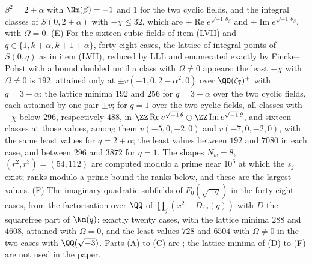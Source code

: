 \begin{enumerate}[label=\textup{(\Roman*)},leftmargin=*]
  $\beta^{2}=2+\alpha$ with $\Nm(\beta)=-1$ and $1$ for the two cyclic
  fields, and the integral classes of $S(0,2+\alpha)$ with $-\chi\le32$,
  which are $\pm\operatorname{Re}e^{\sqrt{-1}\,\theta_{\beta}}$ and
  $\pm\operatorname{Im}e^{\sqrt{-1}\,\theta_{\beta}}$, with $\Omega=0$. (E)
  For the sixteen cubic fields of item (LVII) and $q\in\{1,k+\alpha,
  k+1+\alpha\}$, forty-eight cases, the lattice of integral points of
  $S(0,q)$ as in item (LVII), reduced by LLL and enumerated exactly by
  Fincke--Pohst with a bound doubled until a class with $\Omega\ne0$
  appears: the least $-\chi$ with $\Omega\ne0$ is $192$, attained only at
  $\pm v(-1,0,2-\alpha^{2},0)$ over $\QQ(\zeta_{7})^{+}$ with $q=3+\alpha$;
  the lattice minima $192$ and $256$ for $q=3+\alpha$ over the two cyclic
  fields, each attained by one pair $\pm v$; for $q=1$ over the two cyclic
  fields, all classes with $-\chi$ below $296$, respectively $488$, in
  $\ZZ\operatorname{Re}e^{\sqrt{-1}\,\theta}\oplus\ZZ\operatorname{Im}
  e^{\sqrt{-1}\,\theta}$, and sixteen classes at those values, among them
  $v(-5,0,-2,0)$ and $v(-7,0,-2,0)$, with the same least values for
  $q=2+\alpha$; the least values between $192$ and $7080$ in each case, and
  between $296$ and $3872$ for $q=1$. The shapes $N_{w}=8$,
  $(r^{2},r^{3})=(54,112)$ are computed modulo a prime near $10^{6}$ at which
  the $s_{j}$ exist; ranks modulo a prime bound the ranks below, and these
  are the largest values. (F) The imaginary quadratic subfields of
  $F_{0}(\sqrt{-q})$ in the forty-eight cases, from the factorisation over
  $\QQ$ of $\prod_{j}(x^{2}-D\tau_{j}(q))$ with $D$ the squarefree part of
  $\Nm(q)$: exactly twenty cases, with
  the lattice minima $288$ and $4608$, attained with $\Omega=0$, and the
  least values $728$ and $6504$ with $\Omega\ne0$ in the two cases with
  $\QQ(\sqrt{-3})$. Parts (A) to (C) are ; the lattice
  minima of (D) to (F) are not used in the paper.


\end{enumerate}
